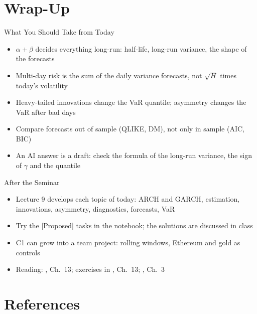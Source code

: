 \section{Wrap-Up}

\begin{frame}{What You Should Take from Today}
\itemsize{\small}
\begin{itemize}
    \item $\alpha + \beta$ decides everything long-run: half-life, long-run variance, the shape of the forecasts
    \item Multi-day risk is the sum of the daily variance forecasts, not $\sqrt{H}$ times today's volatility
    \item Heavy-tailed innovations change the VaR quantile; asymmetry changes the VaR after bad days
    \item Compare forecasts out of sample (QLIKE, DM), not only in sample (AIC, BIC)
    \item An AI answer is a draft: check the formula of the long-run variance, the sign of $\gamma$ and the quantile
\end{itemize}
\end{frame}

\begin{frame}{After the Seminar}
\itemsize{\small}
\begin{itemize}
    \item Lecture 9 develops each topic of today: ARCH and GARCH, estimation, innovations, asymmetry, diagnostics, forecasts, VaR
    \item Try the [Proposed] tasks in the notebook; the solutions are discussed in class
    \item C1 can grow into a team project: rolling windows, Ethereum and gold as controls
    \item Reading: , Ch.~13; exercises in , Ch.~13; , Ch.~3
\end{itemize}
\end{frame}


\section{References}

